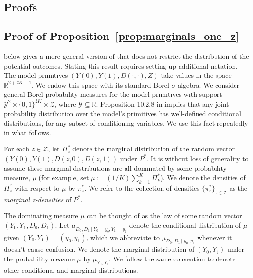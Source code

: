 \documentclass[12pt]{article}%
\theoremstyle{definition}
\newcommand\1{\operatorname{I}\indicatorfence}
\begin{document}
\begin{appendices}

\renewcommand{\figurename}{Appendix Figure}
\setcounter{figure}{0}
\renewcommand{\tablename}{Appendix Table}
\setcounter{table}{0}



\section{Proofs}\label{sec:proofs}

\subsection{Proof of Proposition~\ref{prop:marginals_one_z}}\label{sec:proof_marginals_one_z}

 below gives a more general version of
 that does not restrict the distribution of the
potential outcomes. Stating this result requires setting up additional notation.
The model primitives $(Y(0), Y(1), D(\cdot, \cdot), Z)$ take values in the space $\mathbb{R}^{2+2K+1}$. We endow this space with its standard Borel $\sigma$-algebra. We consider general Borel probability measures for the model primitives with support $\mathcal{Y}^2 \times \{0,1\}^{2K} \times \mathcal{Z}$, where $\mathcal{Y}\subseteq\mathbb{R}$. Proposition 10.2.8 in \textcite{dudley2018real}
implies that any joint probability distribution over the model's primitives has well-defined conditional distributions, for any subset of conditioning variables. We use this fact repeatedly in what follows.

For each $z \in\mathcal{Z}$, let $\Pi^*_{z}$ denote the marginal distribution of
the random vector $(Y(0), \allowbreak Y(1), \allowbreak D(z,0), D(z,1))$ under
$P^*$. It is without loss of generality to assume these marginal distributions
are all dominated by some probability measure, $\mu$ (for example, set
$\mu := (1/K) \sum_{k=1}^{K} \Pi^*_{k}$). We denote the densities of
$\Pi^*_{z}$ with respect to $\mu$ by $\pi^*_{z}$. We refer to the collection of
densities $\{\pi^*_{z}\}_{z \in\mathcal{Z}}$ as the \emph{marginal
  $z$-densities} of $P^*$.

The dominating measure $\mu$ can be thought of as the law of some random vector
$(Y_{0}, Y_{1}, \allowbreak D_{0}, D_{1})$. Let
$\mu_{D_{0}, D_{1}\mid Y_{0}=y_0, Y_{1}=y_1}$ denote the conditional distribution
of $\mu$ given $(Y_0, Y_1)=(y_0, y_1)$, which we abbreviate to
$\mu_{D_{0}, D_{1}\mid y_0,y_1}$ whenever it doesn't cause confusion. We denote
the marginal distribution of $(Y_0,Y_1)$ under the probability measure $\mu$ by
$\mu_{Y_{0}, Y_{1}}$. We follow the same convention to denote other conditional
and marginal distributions.


\end{appendices}
\end{document}
